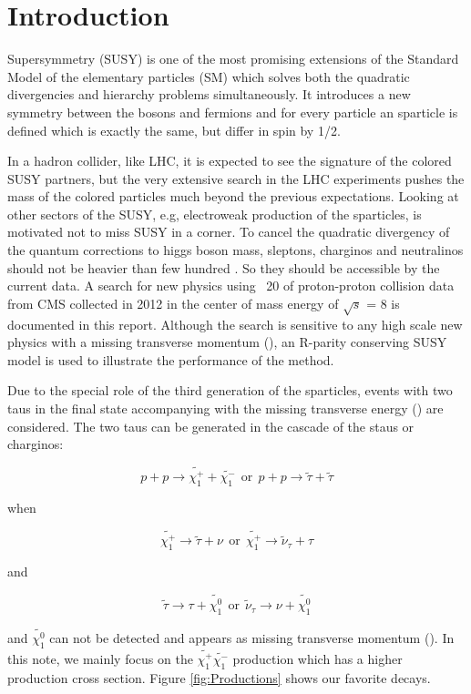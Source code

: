 \section{Introduction}
\label{sect:introduction}
Supersymmetry \cite{Martin:1997ns} (SUSY) is one of the most promising extensions of the 
Standard Model of the elementary particles (SM) which solves both the 
quadratic divergencies and hierarchy problems simultaneously. It introduces a new symmetry between the bosons and fermions and 
for every particle an sparticle is defined which is exactly the same, but differ in spin by 1/2. 

In a hadron collider, like LHC, it is expected to see the signature of the colored SUSY partners, 
but the very extensive search in the LHC experiments pushes the mass of the colored particles much 
beyond the previous expectations. 
Looking at other sectors of the SUSY, e.g, electroweak production of the sparticles, is motivated not to miss SUSY in a corner. 
To cancel the quadratic divergency of the quantum corrections to higgs boson mass,  sleptons, charginos and neutralinos 
should not be heavier than few hundred \GeV \cite{1988NuPhB.306...63B, deCarlos:1993yy}. So they should be accessible by the current data.
A search for new physics using ~20 \fbinv of proton-proton collision data from CMS collected in 2012 in the center of mass energy of 
$\sqrt{s}$ = 8 \TeV  is documented in this report. 
Although the search is sensitive to any high scale new physics with a missing transverse momentum (\MET), 
an R-parity conserving SUSY model is used to illustrate the performance of the method.

Due to the special role of the third generation of the sparticles, events with two taus in the final state 
accompanying with the missing transverse energy (\met) are considered.
The two taus can be generated in the cascade of the staus or charginos:
\begin{linenomath}
\begin{equation}
p + p \rightarrow \tilde{\chi_{1}^{+}} + \tilde{\chi_{1}^{-}} ~~\mathrm{or}~~  p + p \rightarrow \tilde{\tau} + \tilde{\tau}
\end{equation}
\end{linenomath}
when 
\begin{linenomath}
\begin{equation}
\tilde{\chi_{1}^{+}} \rightarrow \tilde{\tau} + \nu ~~\mathrm{or}~~  \tilde{\chi_{1}^{+}} \rightarrow \tilde{\nu}_{\tau} + \tau 
\end{equation}
\end{linenomath}
and 
\begin{linenomath}
\begin{equation}
\tilde{\tau} \rightarrow \tau + \tilde{\chi_{1}^{0}} ~~\mathrm{or}~~  \tilde{\nu}_{\tau} \rightarrow \nu + \tilde{\chi_{1}^{0}} 
\end{equation}
\end{linenomath}
and $\tilde{\chi_{1}^{0}}$ can not be detected and appears as missing transverse momentum (\met).
In this note, we mainly focus on the $\tilde{\chi_{1}^{+}}\tilde{\chi_{1}^{-}}$ production which has a higher 
production cross section. Figure \ref{fig:Productions} shows our favorite decays.

